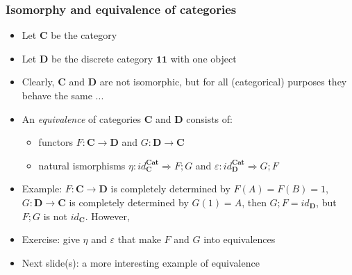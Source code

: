 \documentclass[handout]{beamer}
\newcommand{\To}{\Rightarrow}
\newcommand{\bfsf}[1]{{\boldsymbol{#1}}}
\newcommand{\CC}{\bfsf{C}}
\newcommand{\DD}{\bfsf{D}}
\newcommand{\Cat}{\bfsf{Cat}}
\begin{document}
\frame
  {   
    \frametitle{Isomorphy and equivalence of categories}\label{Ch3:EqCat}

 \begin{itemize}[<+->]
\item Let $\CC$ be the category 
\item Let $\DD$ be the discrete category $\bfsf{1\!\!1}$ with one object
\item Clearly, $\CC$ and $\DD$ are not isomorphic, but for
all (categorical) purposes they behave the same ...
\item An \emph{equivalence} of categories $\CC$ and $\DD$
consists of: %
 \begin{itemize}
\item functors  $F :\CC\to\DD$ and $G:\DD\to\CC$
\item natural ismorphisms $\eta: id^\Cat_\CC \To F;G$ and $\varepsilon :  id^\Cat_\DD \To G;F$
 \end{itemize}
\item Example: $F: \CC\to\DD$ is completely determined by $F(A)=F(B)= 1$,
 $G: \DD\to\CC$ is completely determined by $G(1)=A$, 
then $G;F = id_\DD$, but $F;G$ is {\color{red}not} $id_\CC$. However,
\item Exercise: give $\eta$ and $\varepsilon$ that make $F$ and $G$ into equivalences
\item Next slide(s): a more interesting example of equivalence
 \end{itemize}

 }
\end{document}
